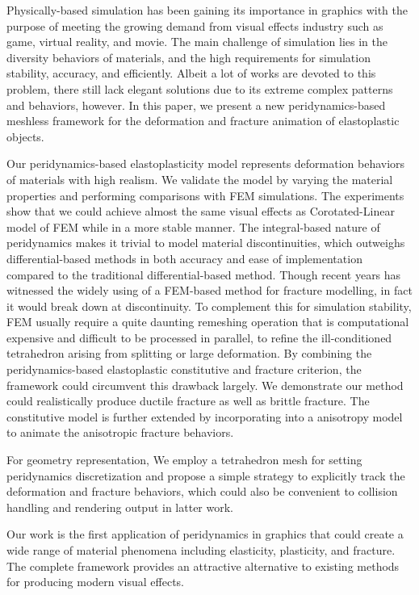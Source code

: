 \begin{eabstract}
Physically-based simulation has been gaining its importance in graphics with the purpose of meeting the growing demand from visual effects industry such as game, virtual reality, and movie.
The main challenge of simulation lies in the diversity behaviors of materials, and the high requirements for simulation stability, accuracy, and efficiently.
Albeit a lot of works are devoted to this problem, there still lack elegant solutions due to its extreme complex patterns and behaviors, however.
In this paper, we present a new peridynamics-based meshless framework for the deformation and fracture animation of elastoplastic objects.

Our peridynamics-based elastoplasticity model represents deformation behaviors of materials with high realism.
We validate the model by varying the material properties and performing comparisons with FEM simulations.
The experiments show that we could achieve almost the same visual effects as Corotated-Linear model of FEM while in a more stable manner.
The integral-based nature of peridynamics makes it trivial to model material discontinuities, which outweighs differential-based methods in both accuracy and ease of implementation compared to the traditional differential-based method.
Though recent years has witnessed the widely using of a FEM-based method for fracture modelling, in fact it would break down at discontinuity.
To complement this for simulation stability, FEM usually require a quite daunting remeshing operation that is computational expensive and difficult to be processed in parallel,
to refine the ill-conditioned tetrahedron arising from splitting or large deformation.
By combining the peridynamics-based elastoplastic constitutive and fracture criterion, the framework could circumvent this drawback largely.
We demonstrate our method could realistically produce ductile fracture as well as brittle fracture.
The constitutive model is further extended by incorporating into a anisotropy model to animate the anisotropic fracture behaviors.

For geometry representation, We employ a tetrahedron mesh for setting peridynamics discretization and propose a simple strategy to explicitly track the deformation and fracture behaviors,
which could also be convenient to collision handling and rendering output in latter work.

Our work is the first application of peridynamics in graphics that could create a wide range of material phenomena including elasticity, plasticity, and fracture.
The complete framework provides an attractive alternative to existing methods for producing modern visual effects.



\end{eabstract}

